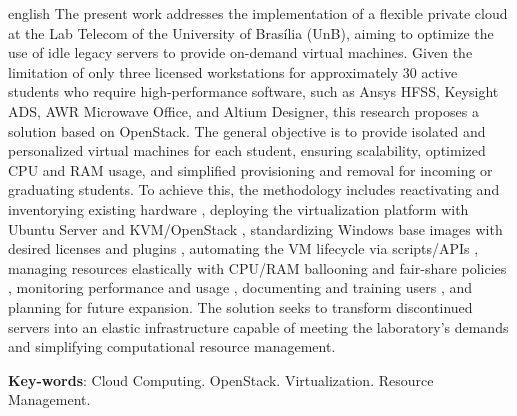 \begin{resumo}[Abstract]
 \begin{otherlanguage*}{english}
  The present work addresses the implementation of a flexible private cloud at the Lab Telecom of the University of Brasília (UnB), aiming to optimize the use of idle legacy servers to provide on-demand virtual machines. Given the limitation of only three licensed workstations for approximately 30 active students who require high-performance software, such as Ansys HFSS, Keysight ADS, AWR Microwave Office, and Altium Designer, this research proposes a solution based on OpenStack. The general objective is to provide isolated and personalized virtual machines for each student, ensuring scalability, optimized CPU and RAM usage, and simplified provisioning and removal for incoming or graduating students. To achieve this, the methodology includes reactivating and inventorying existing hardware , deploying the virtualization platform with Ubuntu Server and KVM/OpenStack , standardizing Windows base images with desired licenses and plugins , automating the VM lifecycle via scripts/APIs , managing resources elastically with CPU/RAM ballooning and fair-share policies , monitoring performance and usage , documenting and training users , and planning for future expansion. The solution seeks to transform discontinued servers into an elastic infrastructure capable of meeting the laboratory's demands and simplifying computational resource management.

   \vspace{\onelineskip}
 
   \noindent 
   \textbf{Key-words}: Cloud Computing. OpenStack. Virtualization. Resource Management.
 \end{otherlanguage*}
\end{resumo}
